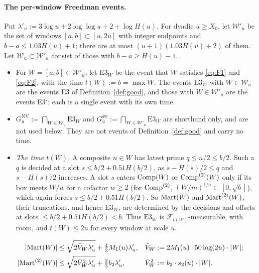 \paragraph{The per-window Freedman events.} Put $\lambda'_u:=3\log u+2\log\log u+2+\log H(u)$. For dyadic $u\ge X_0$, let
$\mathcal W'_u$ be the set of windows $[a,b]\subset[u,2u]$ with integer endpoints and $b-a\le1.03H(u)+1$; there are at most
$(u+1)(1.03H(u)+2)$ of them. Let $\mathcal W_u\subset\mathcal W'_u$ consist of those with $b-a\ge H(u)-1$.
\begin{itemize}
\item For $W=[a,b]\in\mathcal W'_u$, let $\mathrm{E3}_W$ be the event that $W$ satisfies \eqref{eq:F1} and \eqref{eq:F2}, with the time
  $t(W):=b=\max W$. The events $\mathrm{E3}_W$ with $W\in\mathcal W_u$ are the events E3 of Definition~\ref{def:good}, and those with
  $W\in\mathcal W'_u$ are the events E3$'$; each is a single event with its own time.
\item $G_u^{\mathrm{NV}}:=\bigcap_{W\in\mathcal W_u}\mathrm{E3}_W$ and $G_u^{\mathrm{sw}}:=\bigcap_{W\in\mathcal W'_u}\mathrm{E3}_W$ are shorthand only, and
  are not used below. They are not events of Definition~\ref{def:good} and carry no time.
\item \emph{The time $t(W)$.} A composite $n\in W$ has latest prime $q\le n/2\le b/2$. Such a $q$ is decided at a slot
  $s\le b/2+0.51H(b/2)$, as $s-H(s)/2\le q$ and $s-H(s)/2$ increases. A slot $s$ enters $\mathrm{Comp}(W)$ or $\mathrm{Comp}^{(2)}(W)$ only if its box meets $W/w$ for a cofactor $w\ge2$ (for $\mathrm{Comp}^{(2)}$, $(W/m)^{1/a}\subset[0,\sqrt b]$), which again forces $s\le b/2+0.51H(b/2)$. So $\mathrm{Mart}(W)$ and $\mathrm{Mart}^{(2)}(W)$,
  their truncations, and hence $\mathrm{E3}_W$, are determined by the decisions and offsets at slots $\le b/2+0.51H(b/2)<b$. Thus $\mathrm{E3}_W$
  is $\mathcal F_{t(W)}$-measurable, with room, and $t(W)\le2u$ for every window at scale $u$.
\end{itemize}
\begin{align}
  |\mathrm{Mart}(W)|&\le\sqrt{2\bar V_W\lambda'_u}+\tfrac43M_1(u)\lambda'_u,&\bar V_W&:=2M_1(u)\cdot50\log(2u)\cdot|W|;\label{eq:F1}\\
  |\mathrm{Mart}^{(2)}(W)|&\le\sqrt{2\bar V^2_W\lambda'_u}+\tfrac23b_2\lambda'_u,&\bar V^2_W&:=b_2\cdot s_2(u)\cdot|W|.\label{eq:F2}
\end{align}

